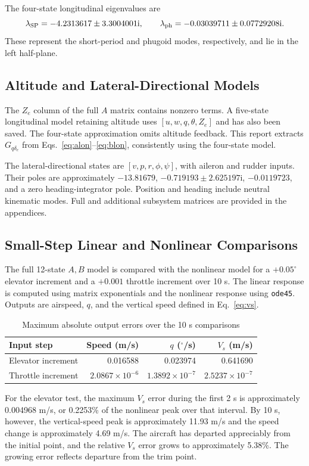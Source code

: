 \documentclass[a4paper,11pt]{article}
\newcommand{\Gq}{G_{q\delta_e}}
\begin{document}
The four-state longitudinal eigenvalues are
\begin{equation}
\lambda_{\rm SP}=-4.2313617\pm3.3004001\mathrm i,\qquad
\lambda_{\rm ph}=-0.03039711\pm0.07729208\mathrm i.
\end{equation}
These represent the short-period and phugoid modes, respectively, and lie in the left half-plane.

\subsection{Altitude and Lateral-Directional Models}
The $Z_e$ column of the full $A$ matrix contains nonzero terms. A five-state longitudinal model retaining altitude uses $[u,w,q,\theta,Z_e]$ and has also been saved. The four-state approximation omits altitude feedback. This report extracts $\Gq$ from Eqs.~\eqref{eq:alon}--\eqref{eq:blon}, consistently using the four-state model.

The lateral-directional states are $[v,p,r,\phi,\psi]$, with aileron and rudder inputs. Their poles are approximately $-13.81679$, $-0.719193\pm2.625197\mathrm i$, $-0.0119723$, and a zero heading-integrator pole. Position and heading include neutral kinematic modes. Full and additional subsystem matrices are provided in the appendices.

\subsection{Small-Step Linear and Nonlinear Comparisons}
The full 12-state $A,B$ model is compared with the nonlinear model for a $+0.05^\circ$ elevator increment and a $+0.001$ throttle increment over 10 s. The linear response is computed using matrix exponentials and the nonlinear response using \texttt{ode45}. Outputs are airspeed, $q$, and the vertical speed defined in Eq.~\eqref{eq:vs}.
\begin{table}[H]\centering
\caption{Maximum absolute output errors over the 10 s comparisons}
\begin{tabular}{lrrr}\toprule
Input step&Speed (m/s)&$q$ ($^\circ$/s)&$V_s$ (m/s)\\\midrule
Elevator increment&0.016588&0.023974&0.641690\\
Throttle increment&$2.0867\times10^{-6}$&$1.3892\times10^{-7}$&$2.5237\times10^{-7}$\\\bottomrule
\end{tabular}
\end{table}
For the elevator test, the maximum $V_s$ error during the first 2 s is approximately 0.004968 m/s, or 0.2253\% of the nonlinear peak over that interval. By 10 s, however, the vertical-speed peak is approximately 11.93 m/s and the speed change is approximately 4.69 m/s. The aircraft has departed appreciably from the initial point, and the relative $V_s$ error grows to approximately 5.38\%. The growing error reflects departure from the trim point.
\end{document}

